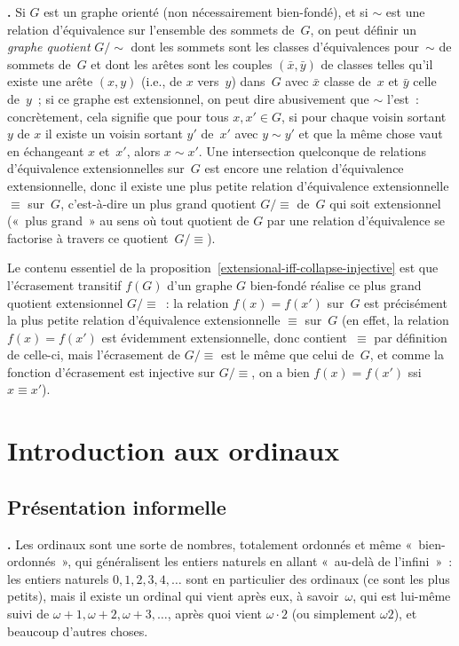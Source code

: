 \documentclass[12pt,a4paper]{article}
\theoremstyle{definition}
\newcommand\thingy{%
\refstepcounter{comcnt}\smallskip\noindent\textbf{\thecomcnt.} }
\begin{document}
\thingy Si $G$ est un graphe orienté (non nécessairement bien-fondé),
et si $\sim$ est une relation d'équivalence sur l'ensemble des sommets
de $G$, on peut définir un \emph{graphe quotient} $G/\sim$ dont les
sommets sont les classes d'équivalences pour $\sim$ de sommets de $G$
et dont les arêtes sont les couples $(\bar x,\bar y)$ de classes
telles qu'il existe une arête $(x,y)$ (i.e., de $x$ vers $y$) dans $G$
avec $\bar x$ classe de $x$ et $\bar y$ celle de $y$ ; si ce graphe
est extensionnel, on peut dire abusivement que $\sim$ l'est :
concrètement, cela signifie que pour tous $x,x' \in G$, si pour chaque
voisin sortant $y$ de $x$ il existe un voisin sortant $y'$ de $x'$
avec $y \sim y'$ et que la même chose vaut en échangeant $x$ et $x'$,
alors $x \sim x'$.  Une intersection quelconque de relations
d'équivalence extensionnelles sur $G$ est encore une relation
d'équivalence extensionnelle, donc il existe une plus petite relation
d'équivalence extensionnelle $\equiv$ sur $G$, c'est-à-dire un plus
grand quotient $G/\equiv$ de $G$ qui soit extensionnel (« plus grand »
au sens où tout quotient de $G$ par une relation d'équivalence se
factorise à travers ce quotient $G/\equiv$).

Le contenu essentiel de la
proposition \ref{extensional-iff-collapse-injective} est que
l'écrasement transitif $f(G)$ d'un graphe $G$ bien-fondé réalise ce
plus grand quotient extensionnel $G/\equiv$ : la relation $f(x) =
f(x')$ sur $G$ est précisément la plus petite relation d'équivalence
extensionnelle $\equiv$ sur $G$ (en effet, la relation $f(x) = f(x')$
est évidemment extensionnelle, donc contient $\equiv$ par définition
de celle-ci, mais l'écrasement de $G/\equiv$ est le même que celui
de $G$, et comme la fonction d'écrasement est injective sur
$G/\equiv$, on a bien $f(x) = f(x')$ ssi $x\equiv x'$).


%
%
%

\section{Introduction aux ordinaux}\label{section-ordinals}

\subsection{Présentation informelle}\label{subsection-informal-description-of-ordinals}

\thingy Les ordinaux sont une sorte de nombres, totalement ordonnés et
même « bien-ordonnés », qui généralisent les entiers naturels en
allant « au-delà de l'infini » : les entiers naturels
$0,1,2,3,4,\ldots$ sont en particulier des ordinaux (ce sont les plus
petits), mais il existe un ordinal qui vient après eux, à
savoir $\omega$, qui est lui-même suivi de
$\omega+1,\omega+2,\omega+3,\ldots$, après quoi vient $\omega\cdot 2$
(ou simplement $\omega 2$), et beaucoup d'autres choses.
\end{document}

